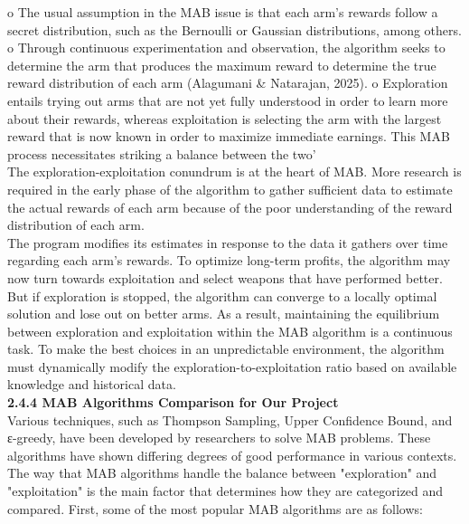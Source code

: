 \documentclass[a4paper,11pt,onecolumn]{article}
\begin{document}
o	The usual assumption in the MAB issue is that each arm's rewards follow a secret distribution, such as the Bernoulli or Gaussian distributions, among others.
o	Through continuous experimentation and observation, the algorithm seeks to determine the arm that produces the maximum reward to determine the true reward distribution of each arm (Alagumani & Natarajan, 2025).
o	Exploration entails trying out arms that are not yet fully understood in order to learn more about their rewards, whereas exploitation is selecting the arm with the largest reward that is now known in order to maximize immediate earnings. This MAB process necessitates striking a balance between the two'\\
The exploration-exploitation conundrum is at the heart of MAB. More research is required in the early phase of the algorithm to gather sufficient data to estimate the actual rewards of each arm because of the poor understanding of the reward distribution of each arm.\\
The program modifies its estimates in response to the data it gathers over time regarding each arm's rewards. To optimize long-term profits, the algorithm may now turn towards exploitation and select weapons that have performed better. But if exploration is stopped, the algorithm can converge to a locally optimal solution and lose out on better arms. As a result, maintaining the equilibrium between exploration and exploitation within the MAB algorithm is a continuous task. To make the best choices in an unpredictable environment, the algorithm must dynamically modify the exploration-to-exploitation ratio based on available knowledge and historical data.\newline \\
\textbf{2.4.4 MAB Algorithms Comparison for Our Project}\linebreak \\
Various techniques, such as Thompson Sampling, Upper Confidence Bound, and ε-greedy, have been developed by researchers to solve MAB problems. These algorithms have shown differing degrees of good performance in various contexts. The way that MAB algorithms handle the balance between "exploration" and "exploitation" is the main factor that determines how they are categorized and compared. First, some of the most popular MAB algorithms are as follows: \newline \\
\end{document}
